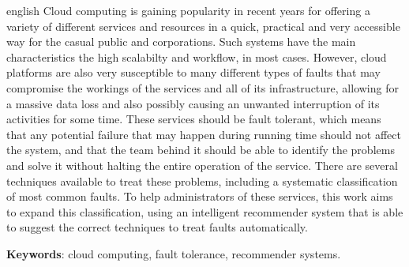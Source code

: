 \documentclass[
	12pt,				%
	oneside,			%
	a4paper,			%
	chapter=TITLE,		%
	english,			%
	french,				%
	spanish,			%
	brazil				%
	]{abntex2}
\newcommand{\listofquadrosname}{Lista de quadros}
\begin{document}
\begin{resumo}[Abstract]
 \begin{otherlanguage*}{english}
   Cloud computing is gaining popularity in recent years for offering a variety of different services and resources in a quick, practical and very accessible way for the casual public and corporations. Such systems have the main characteristics the high scalabilty and workflow, in most cases. However, cloud platforms are also very susceptible to many different types of faults that may compromise the workings of the services and all of its infrastructure, allowing for a massive data loss and also possibly causing an unwanted interruption of its activities for some time. These services should be fault tolerant, which means that any potential failure that may happen during running time should not affect the system, and that the team behind it should be able to identify the problems and solve it without halting the entire operation of the service. There are several techniques available to treat these problems, including a systematic classification of most common faults. To help administrators of these services, this work aims to expand this classification, using an intelligent recommender system that is able to suggest the correct techniques to treat faults automatically.

   \vspace{\onelineskip}
 
   \noindent 
   \textbf{Keywords}: cloud computing, fault tolerance, recommender systems.
 \end{otherlanguage*}
\end{resumo}

\listoffigures*
\cleardoublepage


\listoftables*
\cleardoublepage

\end{document}
